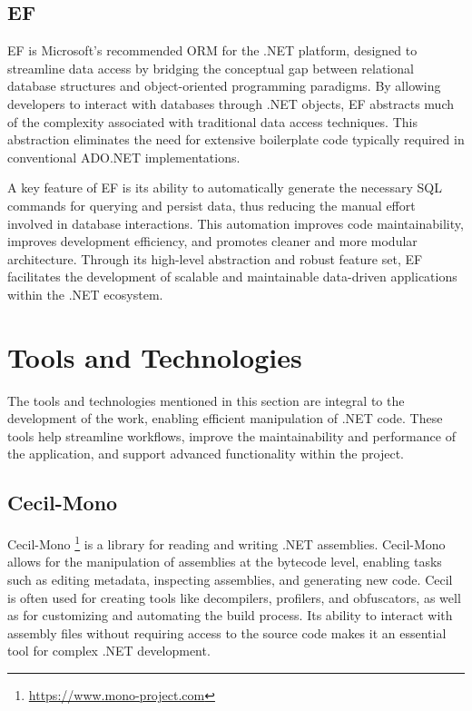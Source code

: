 \subsection{\acf{EF}}

\acf{EF} is Microsoft's recommended \acf{ORM} for the .NET platform, designed to streamline data access by bridging the conceptual gap between relational database structures and object-oriented programming paradigms. By allowing developers to interact with databases through .NET objects, \ac{EF} abstracts much of the complexity associated with traditional data access techniques. This abstraction eliminates the need for extensive boilerplate code typically required in conventional ADO.NET implementations.

A key feature of \ac{EF} is its ability to automatically generate the necessary SQL commands for querying and persist data, thus reducing the manual effort involved in database interactions. This automation improves code maintainability, improves development efficiency, and promotes cleaner and more modular architecture. Through its high-level abstraction and robust feature set, \ac{EF} facilitates the development of scalable and maintainable data-driven applications within the .NET ecosystem.

\section{Tools and Technologies}

The tools and technologies mentioned in this section are integral to the development of the work, enabling efficient manipulation of .NET code. These tools help streamline workflows, improve the maintainability and performance of the application, and support advanced functionality within the project.

\subsection{Cecil-Mono}
Cecil-Mono \footnote{\href{https://www.mono-project.com/docs/tools+libraries/libraries/Mono.Cecil/}{https://www.mono-project.com}} is a library for reading and writing .NET assemblies. Cecil-Mono allows for the manipulation of assemblies at the bytecode level, enabling tasks such as editing metadata, inspecting assemblies, and generating new code. Cecil is often used for creating tools like decompilers, profilers, and obfuscators, as well as for customizing and automating the build process. Its ability to interact with assembly files without requiring access to the source code makes it an essential tool for complex .NET development.

